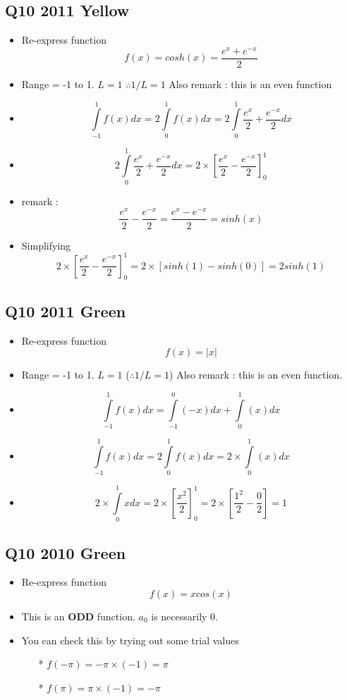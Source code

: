 \documentclass[11pt,a4paper,titlepage,oneside,openany]{article}
\numberwithin{equation}{section}
\numberwithin{algorithm}{section}
\numberwithin{figure}{section}
\numberwithin{table}{section}
\begin{document}
\subsection*{Q10 2011 Yellow} %
\Large{
\begin{itemize}
\item Re-express function \[f(x) = cosh(x) = \frac{e^{x} + e^{-x}}{2} \]
\item Range = -1 to 1. $L=1$ $\therefore 1/L = 1$ Also remark : this is an even function
\item \[\int\limits^{1}_{-1} f(x) dx = 2\int\limits^{1}_{0} f(x) dx = 2\int\limits^{1}_{0}\frac{e^{x}}{2} + \frac{e^{-x}}{2} dx \]
    \item \[ 2\int\limits^{1}_{0}\frac{e^{x}}{2} + \frac{e^{-x}}{2} dx  = 2\times \left[ \frac{e^{x}}{2} - \frac{e^{-x}}{2} \right]^{1}_{0} \]
\item remark : \[ \frac{e^{x}}{2} - \frac{e^{-x}}{2} = \frac{e^{x} - e^{-x}}{2}= sinh(x )\] 
\item Simplifying 
\[ 2\times \left[ \frac{e^{x}}{2} - \frac{e^{-x}}{2} \right]^{1}_{0}  = 2\times \left[sinh(1) - sinh(0)\right] = 2sinh(1) \]
\end{itemize}
}
\newpage
\subsection*{Q10 2011 Green} 
\Large{
\begin{itemize}
\item Re-express function \[f(x) = |x|  \]
\item Range = -1 to 1. $L=1$ ($\therefore 1/L = 1$) Also remark : this is an even function.
\item \[\int\limits^{1}_{-1} f(x) dx = \int\limits^{0}_{-1} (-x) dx + \int\limits^{1}_{0} (x) dx \]
\item \[\int\limits^{1}_{-1} f(x) dx = 2\int\limits^{1}_{0} f(x) dx = 2 \times \int\limits^{1}_{0} (x) dx \]

\item \[ 2 \times \int\limits^{1}_{0} x dx = 2 \times \left[ \frac{x^2}{2} \right]^{1}_{0} = 
2 \times \left[ \frac{1^2}{2} - \frac{0}{2} \right]  = 1 \] 
\end{itemize}
}

\subsection*{Q10 2010 Green}
\Large{
\begin{itemize}
\item Re-express function \[f(x) = xcos(x)  \]
\item This is an \textbf{ODD} function. $a_0$ is necessarily 0.
\item You can check this by trying out some trial values
\begin{itemize}
\item[*] $f(-\pi) = -\pi \times (-1) = \pi$
\item[*] $f(\pi) = \pi \times (-1) = -\pi$
\end{itemize}
\end{itemize}
}
\end{document}

